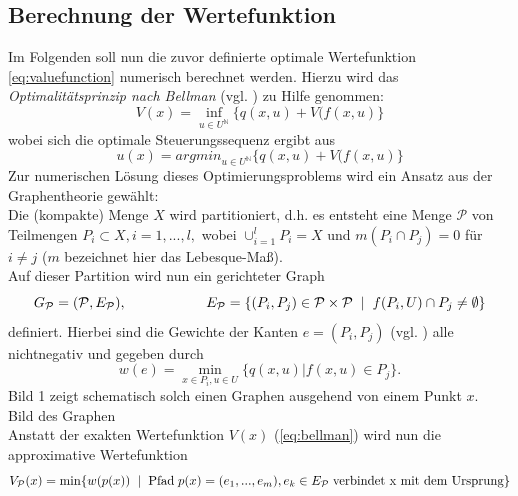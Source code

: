 \documentclass[12pt,a4paper,twoside]{article}
\begin{document}
	\subsection{Berechnung der Wertefunktion}
	Im Folgenden soll nun die zuvor definierte optimale Wertefunktion \ref{eq:valuefunction} numerisch berechnet werden. Hierzu wird das \textit{Optimalitätsprinzip nach Bellman} (vgl. \cite{deuflhard2008}) zu Hilfe genommen:
	\begin{equation}
		\label{eq:bellman}
		V(x)=\inf_{u\in U^{\mathds{N}}}\{q(x,u)+V(f(x,u)\}
	\end{equation}
	wobei sich die optimale Steuerungssequenz ergibt aus
	\begin{equation}
		u(x)=argmin_{u\in U^{\mathds{N}}}\{q(x,u)+V(f(x,u)\}
	\end{equation}
	Zur numerischen Lösung dieses Optimierungsproblems wird ein Ansatz aus der Graphentheorie gewählt: \\
	Die (kompakte) Menge $X$ wird partitioniert, d.h. es entsteht eine Menge $\mathcal{P}$
	von Teilmengen $P_i\subset X, i=1,...,l,$ wobei $\cup_{i=1}^lP_i=X$ und $m(P_i \cap P_j)=0$ für $i\neq j$ ($m$ 
	bezeichnet hier das Lebesque-Maß). \\
	Auf dieser Partition wird nun ein gerichteter Graph 
	\begin{equation*}
		G_\mathcal{P}=(\mathcal{P},E_\mathcal{P}), \hspace{2cm} E_\mathcal{P}=\{(P_i,P_j)\in \mathcal{P}\times \mathcal{P} \hspace{2mm}|\hspace{2mm}f(P_i,U)\cap P_j\neq \emptyset\}
	\end{equation*}
	definiert. Hierbei sind die Gewichte der Kanten $e=(P_i,P_j)$ (vgl. \cite{Junge2004}) alle nichtnegativ und 
	gegeben durch
	\begin{equation*}
		w(e)=\min_{x\in P_i, u\in U}\{q(x,u)|f(x,u)\in P_j\}.
	\end{equation*}
	Bild 1 zeigt schematisch solch einen Graphen ausgehend von einem Punkt $x$.
	\vspace{1cm}
	\\
	Bild des Graphen
	\vspace{1cm}
	\\
	Anstatt der exakten Wertefunktion $V(x)$ (\ref{eq:bellman}) wird nun die approximative Wertefunktion
	\begin{equation*}
		V_\mathcal{P}(x)=\min\{w(p(x)) \hspace{2mm}|\hspace{2mm} \text{Pfad}\hspace{1mm} p(x)=(e_1,...,e_m), e_k\in E_\mathcal{P} \hspace{1mm}\text{verbindet x mit dem Ursprung}\}
	\end{equation*}
\end{document}
